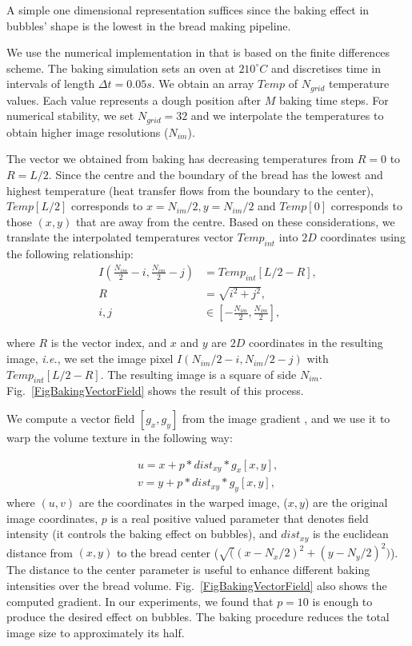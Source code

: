 \documentclass[final,5p,times]{elsarticle}
\begin{document}
{A simple one dimensional representation suffices \cite{Purlis2010,Powathil2004}  since the baking effect in bubbles' shape is the lowest in the bread making pipeline. 

We use the numerical implementation in \cite{Powathil2004} that is based on the finite differences scheme. The baking simulation sets an oven at $210  ^{\circ}C$ and discretises time in intervals of length $\Delta t = 0.05s$.  We obtain an array $Temp$ of $N_{grid}$ temperature values. Each value represents a dough position after $M$ baking time steps. For numerical stability, we set $N_{grid}=32$ and we interpolate the temperatures to obtain higher image resolutions ($N_{im}$).


The vector we obtained from baking has decreasing temperatures from $R = 0$ to $R = L/2$. Since the centre and the boundary of the bread has the lowest and highest temperature (heat transfer flows from the boundary to the center), $Temp[L/2]$ corresponds to $x = N_{im}/2, y=N_{im}/2$ and $Temp[0]$ corresponds to those $(x,y)$ that are away from the centre. Based on these considerations, we translate the interpolated temperatures vector $Temp_{int}$ into $2D$ coordinates using the following relationship:
\begin{align}
\displaystyle I(\frac{N_{im}}{2}-i,\frac{N_{im}}{2}-j) &= Temp_{int}[L/2-R], \\
R &= \sqrt{i^{2}+ j^{2}}, \\
i, j &\in [-\frac{N_{im}}{2},\frac{N_{im}}{2}],
\end{align}


\noindent where $R$ is the vector index, and $x$ and $y$ are $2D$ coordinates in the resulting image, {\em i.e.}, we set the image pixel $I(N_{im}/2-i,N_{im}/2-j)$ with $Temp_{int}[L/2-R]$.  The resulting image is a square of side $N_{im}$. Fig.~\ref{FigBakingVectorField} shows the result of this process.

We compute a vector field $[g_{x},g_{y}]$ from the image gradient \cite{Gonzalez2006}, and we use it to warp the volume texture in the following way:

\begin{align}
\displaystyle u = x+p*dist_{xy}*g_{x}[x,y],\\
v = y+p*dist_{xy}*g_{y}[x,y],
\end{align}
\noindent where $(u,v)$ are the coordinates in the warped image, ($x,y$) are the original image coordinates, $p$ is a real positive valued parameter that denotes field intensity (it controls the baking effect on bubbles), and $dist_{xy}$ is the euclidean distance from $(x,y)$ to the bread center ($\sqrt((x-N_{x}/2)^{2}+(y-N_{y}/2)^{2})$). The distance to the center parameter is useful to enhance different baking intensities over the bread volume. Fig.~\ref{FigBakingVectorField} also shows the computed gradient. In our experiments, we found that $p = 10$ is enough to produce the desired effect on bubbles. The baking procedure reduces the total image size to approximately its half.


}
\end{document}
